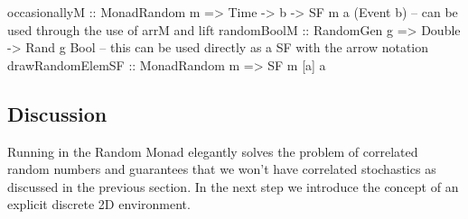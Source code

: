 \begin{HaskellCode}
occasionallyM :: MonadRandom m => Time -> b -> SF m a (Event b)
-- can be used through the use of arrM and lift
randomBoolM :: RandomGen g => Double -> Rand g Bool
-- this can be used directly as a SF with the arrow notation
drawRandomElemSF :: MonadRandom m => SF m [a] a
\end{HaskellCode}

\subsection{Discussion} 
Running in the Random Monad elegantly solves the problem of correlated random numbers and guarantees that we won't have correlated stochastics as discussed in the previous section. In the next step we introduce the concept of an explicit discrete 2D environment.